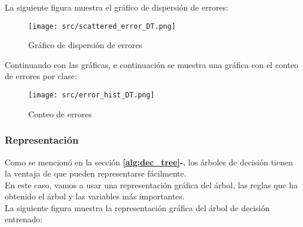 La siguiente figura muestra el gráfico de dispersión de errores:\\
\begin{figure}[H]
	\centering
	\texttt{[image: src/scattered\_error\_DT.png]}
	\caption{Gráfico de dispersión de errores}
	\label{fig:tree_scattered}
\end{figure}
Continuando con las gráficas, e continuación se muestra una gráfica con el conteo de errores por clase:
\begin{figure}[H]
	\centering
	\texttt{[image: src/error\_hist\_DT.png]}
	\caption{Conteo de errores}
	\label{fig:tree_error_plot}
\end{figure}
\subsubsection*{Representación}
Como se mencionó en la sección \textbf{\ref{alg:dec_tree}-}, los árboles de decisión tienen la ventaja de que pueden representarse fácilmente. \\
En este caso, vamos a usar una representación gráfica del árbol, las reglas que ha obtenido el árbol y las variables más importantes.\\
\linebreak
La siguiente figura muestra la representación gráfica del árbol de decisión entrenado:\\

